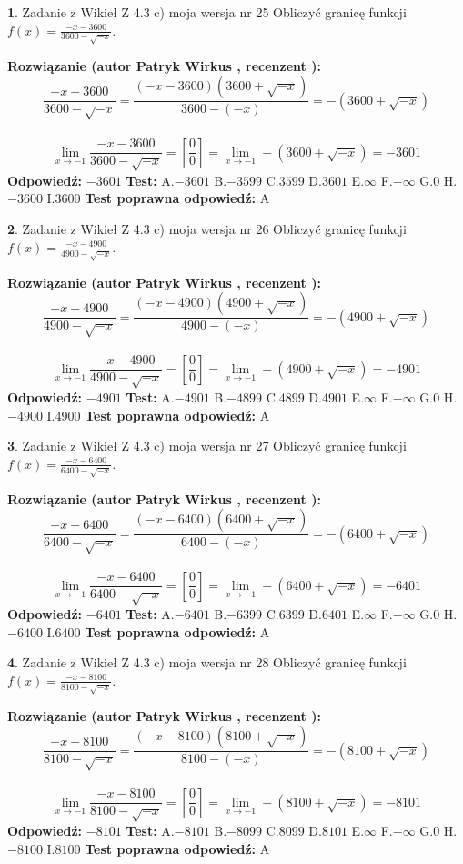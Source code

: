 \documentclass[12pt, a4paper]{article}
\theoremstyle{definition} %
\newtheorem{zad}{}
\newcommand{\zadStart}[1]{\begin{zad}#1\newline}
\newcommand{\zadStop}{\end{zad}}
\newcommand{\rozwStart}[2]{\noindent \textbf{Rozwiązanie (autor #1 , recenzent #2): }\newline}
\newcommand{\rozwStop}{\newline}
\newcommand{\odpStart}{\noindent \textbf{Odpowiedź:}\newline}
\newcommand{\odpStop}{\newline}
\newcommand{\testStart}{\noindent \textbf{Test:}\newline}
\newcommand{\testStop}{\newline}
\newcommand{\kluczStart}{\noindent \textbf{Test poprawna odpowiedź:}\newline}
\newcommand{\kluczStop}{\newline}
\begin{document}
\zadStart{Zadanie z Wikieł Z 4.3 c) moja wersja nr 25}
Obliczyć granicę funkcji $f(x)=\frac{-x-3600}{3600-\sqrt{-x}}$.
\zadStop
\rozwStart{Patryk Wirkus}{}
$$\frac{-x-3600}{3600-\sqrt{-x}}=\frac{(-x-3600)(3600+\sqrt{-x})}{3600-(-x)}=-(3600+\sqrt{-x})$$
\\
$$\lim\limits_{x\to-1}\frac{-x-3600}{3600-\sqrt{-x}}=[\frac{0}{0}]=\lim\limits_{x\to-1}-(3600+\sqrt{-x}) =-3601$$
\rozwStop
\odpStart
$-3601$
\odpStop
\testStart
A.$-3601$
B.$-3599$
C.$3599$
D.$3601$
E.$\infty$
F.$-\infty$
G.$0$
H.$-3600$
I.$3600$
\testStop
\kluczStart
A
\kluczStop



\zadStart{Zadanie z Wikieł Z 4.3 c) moja wersja nr 26}
Obliczyć granicę funkcji $f(x)=\frac{-x-4900}{4900-\sqrt{-x}}$.
\zadStop
\rozwStart{Patryk Wirkus}{}
$$\frac{-x-4900}{4900-\sqrt{-x}}=\frac{(-x-4900)(4900+\sqrt{-x})}{4900-(-x)}=-(4900+\sqrt{-x})$$
\\
$$\lim\limits_{x\to-1}\frac{-x-4900}{4900-\sqrt{-x}}=[\frac{0}{0}]=\lim\limits_{x\to-1}-(4900+\sqrt{-x}) =-4901$$
\rozwStop
\odpStart
$-4901$
\odpStop
\testStart
A.$-4901$
B.$-4899$
C.$4899$
D.$4901$
E.$\infty$
F.$-\infty$
G.$0$
H.$-4900$
I.$4900$
\testStop
\kluczStart
A
\kluczStop



\zadStart{Zadanie z Wikieł Z 4.3 c) moja wersja nr 27}
Obliczyć granicę funkcji $f(x)=\frac{-x-6400}{6400-\sqrt{-x}}$.
\zadStop
\rozwStart{Patryk Wirkus}{}
$$\frac{-x-6400}{6400-\sqrt{-x}}=\frac{(-x-6400)(6400+\sqrt{-x})}{6400-(-x)}=-(6400+\sqrt{-x})$$
\\
$$\lim\limits_{x\to-1}\frac{-x-6400}{6400-\sqrt{-x}}=[\frac{0}{0}]=\lim\limits_{x\to-1}-(6400+\sqrt{-x}) =-6401$$
\rozwStop
\odpStart
$-6401$
\odpStop
\testStart
A.$-6401$
B.$-6399$
C.$6399$
D.$6401$
E.$\infty$
F.$-\infty$
G.$0$
H.$-6400$
I.$6400$
\testStop
\kluczStart
A
\kluczStop



\zadStart{Zadanie z Wikieł Z 4.3 c) moja wersja nr 28}
Obliczyć granicę funkcji $f(x)=\frac{-x-8100}{8100-\sqrt{-x}}$.
\zadStop
\rozwStart{Patryk Wirkus}{}
$$\frac{-x-8100}{8100-\sqrt{-x}}=\frac{(-x-8100)(8100+\sqrt{-x})}{8100-(-x)}=-(8100+\sqrt{-x})$$
\\
$$\lim\limits_{x\to-1}\frac{-x-8100}{8100-\sqrt{-x}}=[\frac{0}{0}]=\lim\limits_{x\to-1}-(8100+\sqrt{-x}) =-8101$$
\rozwStop
\odpStart
$-8101$
\odpStop
\testStart
A.$-8101$
B.$-8099$
C.$8099$
D.$8101$
E.$\infty$
F.$-\infty$
G.$0$
H.$-8100$
I.$8100$
\testStop
\kluczStart
A
\kluczStop
\end{document}
